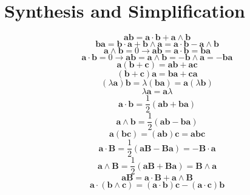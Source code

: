 \documentclass[11pt, a4paper, fleqn]{report}
\numberwithin{equation}{section}
\def\*#1{\mathbf{#1}}
\begin{document}
\section{Synthesis and Simplification}
\begin{equation}
    \*a\*b=\*a\cdot\*b+\*a\wedge\*b
\end{equation}
\begin{equation}
    \*b\*a=\*b\cdot\*a+\*b\wedge\*a=\*a\cdot\*b-\*a\wedge\*b
\end{equation}
\begin{equation}
    \*a\wedge\*b=0\rightarrow \*a\*b=\*a\cdot\*b=\*b\*a
\end{equation}
\begin{equation}
    \*a\cdot\*b=0\rightarrow \*a\*b=\*a\wedge\*b=-\*b\wedge\*a=-\*b\*a
\end{equation}
\begin{equation}
    \*a(\*b + \*c)=\*a\*b + \*a\*c
\end{equation}
\begin{equation}
    (\*b + \*c)\*a=\*b\*a + \*c\*a
\end{equation}
\begin{equation}
    (\lambda\*a)\*b=\lambda(\*b\*a)=\*a(\lambda\*b)
\end{equation}
\begin{equation}
    \lambda\*a=\*a\lambda
\end{equation}
\begin{equation}
    \*a\cdot\*b=\frac{1}{2}(\*a\*b+\*b\*a)
\end{equation}
\begin{equation}
    \*a\wedge\*b=\frac{1}{2}(\*a\*b-\*b\*a)
\end{equation}
\begin{equation}
    \*a(\*b\*c)=(\*a\*b)\*c=\*a\*b\*c
\end{equation}
\begin{equation}
    \*a\cdot\*B=\frac{1}{2}(\*a\*B-\*B\*a)=-\*B\cdot\*a
\end{equation}
\begin{equation}
    \*a\wedge\*B=\frac{1}{2}(\*a\*B+\*B\*a)=\*B\wedge\*a
\end{equation}
\begin{equation}
    \*a\*B=\*a\cdot\*B+\*a\wedge\*B
\end{equation}
\begin{equation}
    \*a\cdot(\*b\wedge\*c)=(\*a\cdot\*b)\*c-(\*a\cdot\*c)\*b
\end{equation}
\end{document}
